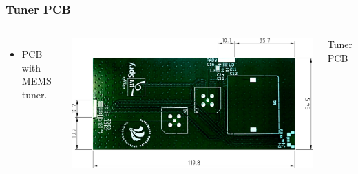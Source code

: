 \begin{frame}[fragile]
    \frametitle{Tuner PCB}
    \begin{columns}[onlytextwidth,t]
          \begin{itemize}
          \item PCB with MEMS tuner.
          \end{itemize}
        \begin{center}
            \includegraphics[scale=0.33]{img/Lasse/samanthas_board.pdf}
        \end{center}
        Tuner PCB
    \end{columns}
\end{frame}

